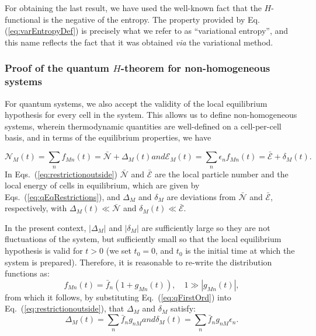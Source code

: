 %
For obtaining the last result, we have used the well-known fact that the $H$-functional
is the negative of the entropy. The property provided by Eq.(\ref{eq:varEntropyDef})
is precisely what we refer to as ``variational entropy'',
and this name reflects the fact that it was obtained \textit{via}
the variational method.

\subsubsection{Proof of the quantum $H$-theorem for non-homogeneous systems}

For quantum systems, we also accept the validity of the local equilibrium hypothesis
for every cell in the system. This allows us to define non-homogeneous systems,
wherein thermodynamic quantities are well-defined on a cell-per-cell basis,
and in terms of the equilibrium properties, we have

%
\begin{subequations}\label{eq:restrictionoutside}
\begin{equation}
        \mathcal{N}_M(t)=\sum_{n}f_{Mn}(t)=\bar{\mathcal{N}}+\Delta_M(t) 
\end{equation}
  and
\begin{equation}
        \mathcal{E}_M(t)=\sum_{n}\epsilon_{n}f_{Mn}(t)=\bar{\mathcal{E}}+ \delta_M(t).
\end{equation}
\end{subequations}
%
In Eqs.~(\ref{eq:restrictionoutside}) $\bar {\mathcal{N}}$ and $\bar{\mathcal{E}}$ are the local particle
number and the local energy of cells in equilibrium, which are given by Eqs.~(\ref{eq:qEqRestrictions}),
and $\Delta_M$ and $\delta_M$ are deviations from $\bar{\mathcal{N}}$
and $\bar{\mathcal{E}}$, respectively, with $\Delta_M(t)\ll \bar{\mathcal{N}}$
and $\delta_M(t) \ll \bar{\mathcal{E}}$. 


In the present context, $|\Delta_M|$ and $|\delta_M|$ are sufficiently large so they are not
fluctuations of the system, but sufficiently small so that the local equilibrium hypothesis is
valid for $t>0$ (we set $t_0=0$, and $t_0$ is the initial time at which the system is prepared).
Therefore, it is reasonable to re-write the distribution functions as:
%
\begin{equation}\label{eq:qFirstOrd}
   f_{Mn}(t)=\bar{f}_n(1+g_{Mn}(t)),\quad
   1\gg|g_{Mn}(t)|,
\end{equation}
%
from which it follows, by substituting Eq.~(\ref{eq:qFirstOrd}) into
Eq.~(\ref{eq:restrictionoutside}), that $\Delta_M$ and $\delta_M$ satisfy:
%
\begin{subequations}
\begin{equation}
    \Delta_M(t)=\sum_n \bar{f}_n g_{nM}
\end{equation}
%
and
%
\begin{equation}
	\delta_M(t)=\sum_n  \bar{f}_n g_{nM}\epsilon_n.
\end{equation}
\end{subequations}
%

